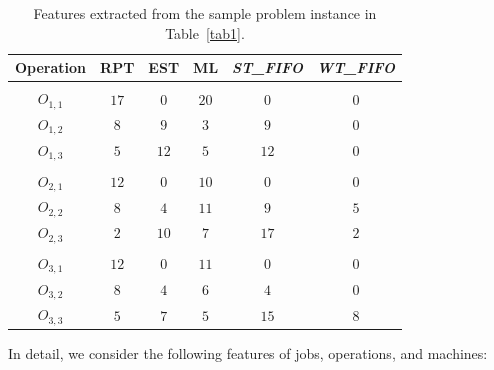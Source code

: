 \documentclass[runningheads]{llncs}
\newcommand{\stfifo}{\textit{ST\_FIFO}\xspace}
\newcommand{\wtfifo}{\textit{WT\_FIFO}\xspace}
\begin{document}
\begin{table}[tb]
  \setlength{\tabcolsep}{10.0pt}
  \centering
    \begin{center}
    \caption{Features extracted from the sample problem instance in Table~\ref{tab1}.}
    \label{tab3}
      \begin{tabular}{c  c  c  c  c  c}
        \textbf{Operation} & \textbf{RPT} & \textbf{EST} & \textbf{ML} & \textbf{\stfifo} & \textbf{\wtfifo}\\
        \hline
                      \\
        $O_{1,1}$  & $17$ & $0$   & $20$	&  $0$  & $0$\\
        $O_{1,2}$  & $8$  & $9$   & $3$		&  $9$  & $0$\\
        $O_{1,3}$  & $5$  & $12$  & $5$	  &  $12$ & $0$\\
                      \\
        $O_{2,1}$  & $12$ & $0$   & $10$	&  $0$  & $0$\\
        $O_{2,2}$  & $8$  & $4$   & $11$	&  $9$  & $5$\\
        $O_{2,3}$  & $2$  & $10$  & $7$	  &  $17$ & $2$\\
                          \\
        $O_{3,1}$  & $12$ & $0$  & $11$	  &  $0$  & $0$\\
        $O_{3,2}$  & $8$  & $4$  & $6$		&  $4$  & $0$\\
        $O_{3,3}$  & $5$  & $7$  & $5$		&  $15$ & $8$\\
      \end{tabular}
    \end{center} 
  \end{table}
%
In detail, we consider the following features of jobs, operations, and machines:
\end{document}
